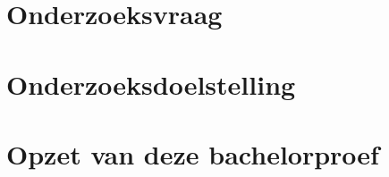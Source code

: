 \section{Onderzoeksvraag}
\label{sec:onderzoeksvraag}

\begin{comment}
Wees zo concreet mogelijk bij het formuleren van je onderzoeksvraag. Een onderzoeksvraag is trouwens iets waar nog niemand op dit moment een antwoord heeft (voor zover je kan nagaan). Het opzoeken van bestaande informatie (bv. ``welke tools bestaan er voor deze toepassing?'') is dus geen onderzoeksvraag. Je kan de onderzoeksvraag verder specifiëren in deelvragen. Bv.~als je onderzoek gaat over performantiemetingen, dan 
\end{comment}

\section{Onderzoeksdoelstelling}%
\label{sec:onderzoeksdoelstelling}

\begin{comment}
Wat is het beoogde resultaat van je bachelorproef? Wat zijn de criteria voor succes? Beschrijf die zo concreet mogelijk. Gaat het bv.\ om een proof-of-concept, een prototype, een verslag met aanbevelingen, een vergelijkende studie, enz.
\end{comment}


\section{Opzet van deze bachelorproef}%
\label{sec:opzet-bachelorproef}

\begin{comment}

De rest van deze bachelorproef is als volgt opgebouwd:

In Hoofdstuk~\ref{ch:stand-van-zaken} wordt een overzicht gegeven van de stand van zaken binnen het onderzoeksdomein, op basis van een literatuurstudie.

In Hoofdstuk~\ref{ch:methodologie} wordt de methodologie toegelicht en worden de gebruikte onderzoekstechnieken besproken om een antwoord te kunnen formuleren op de onderzoeksvragen.


In Hoofdstuk~\ref{ch:conclusie}, tenslotte, wordt de conclusie gegeven en een antwoord geformuleerd op de onderzoeksvragen. Daarbij wordt ook een aanzet gegeven voor toekomstig onderzoek binnen dit domein.
\end{comment}
